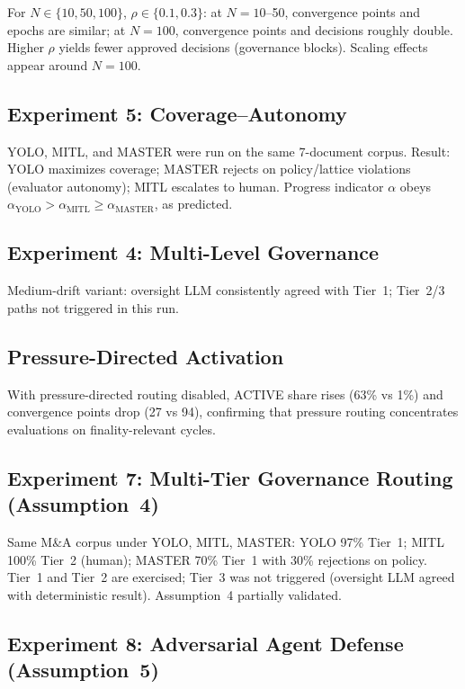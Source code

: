 \documentclass[11pt]{article}
\begin{document}
For $N \in \{10, 50, 100\}$, $\rho \in \{0.1, 0.3\}$: at $N = 10$--50, convergence points and epochs are similar; at $N = 100$, convergence points and decisions roughly double. Higher $\rho$ yields fewer approved decisions (governance blocks). Scaling effects appear around $N = 100$.

\subsection{Experiment 5: Coverage--Autonomy}

YOLO, MITL, and MASTER were run on the same 7-document corpus. Result: YOLO maximizes coverage; MASTER rejects on policy/lattice violations (evaluator autonomy); MITL escalates to human. Progress indicator $\alpha$ obeys $\alpha_{\text{YOLO}} > \alpha_{\text{MITL}} \geq \alpha_{\text{MASTER}}$, as predicted.

\subsection{Experiment 4: Multi-Level Governance}

Medium-drift variant: oversight LLM consistently agreed with Tier~1; Tier~2/3 paths not triggered in this run.

\subsection{Pressure-Directed Activation}

With pressure-directed routing disabled, ACTIVE share rises (63\% vs 1\%) and convergence points drop (27 vs 94), confirming that pressure routing concentrates evaluations on finality-relevant cycles.

\subsection{Experiment 7: Multi-Tier Governance Routing (Assumption~4)}

Same M\&A corpus under YOLO, MITL, MASTER: YOLO 97\% Tier~1; MITL 100\% Tier~2 (human); MASTER 70\% Tier~1 with 30\% rejections on policy. Tier~1 and Tier~2 are exercised; Tier~3 was not triggered (oversight LLM agreed with deterministic result). Assumption~4 partially validated.

\subsection{Experiment 8: Adversarial Agent Defense (Assumption~5)}
\end{document}
